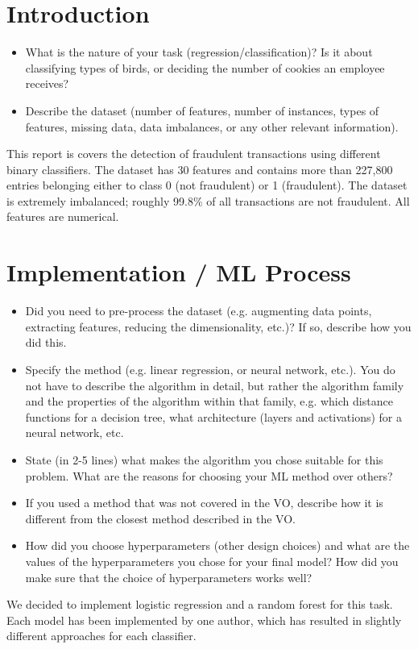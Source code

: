 \documentclass[a4, 10 pt, conference]{ieeeconf}  %
\begin{document}
\section{Introduction}
\label{sec:intro}

{\color{blue}

\begin{itemize}
	\item What is the nature of your task (regression/classification)? Is it about classifying types of birds, or deciding the number of cookies an employee receives?
	\item Describe the dataset (number of features, number of instances, types of features, missing data, data imbalances, or any other relevant information).
\end{itemize}
}

This report is covers the detection of fraudulent transactions using different binary classifiers. The dataset has 30 features and contains more than 227,800 entries belonging either to class 0 (not fraudulent) or 1 (fraudulent). The dataset is extremely imbalanced; roughly 99.8\% of all transactions are not fraudulent. All features are numerical.
\section{Implementation / ML Process}
\label{sec:methods}

{\color{blue}

\begin{itemize}
	\item Did you need to pre-process the dataset (e.g. augmenting data points, extracting features, reducing the dimensionality, etc.)? If so, describe how you did this.
	\item Specify the method (e.g. linear regression, or neural network, etc.). You do not have to describe the algorithm in detail, but rather the algorithm family and the properties of the algorithm within that family, e.g. which distance functions for a decision tree, what architecture (layers and activations) for a neural network, etc. 
	\item State (in 2-5 lines) what makes the algorithm you chose suitable for this problem. What are the reasons for choosing your ML method over others?
    \item If you used a method that was not covered in the VO, describe how it is different from the closest method described in the VO.
	\item How did you choose hyperparameters (other design choices) and what are the values of the hyperparameters you chose for your final model? How did you make sure that the choice of hyperparameters works well?
\end{itemize}
}
We decided to implement logistic regression and a random forest for this task. Each model has been implemented by one author, which has resulted in slightly different approaches for each classifier.
\end{document}

